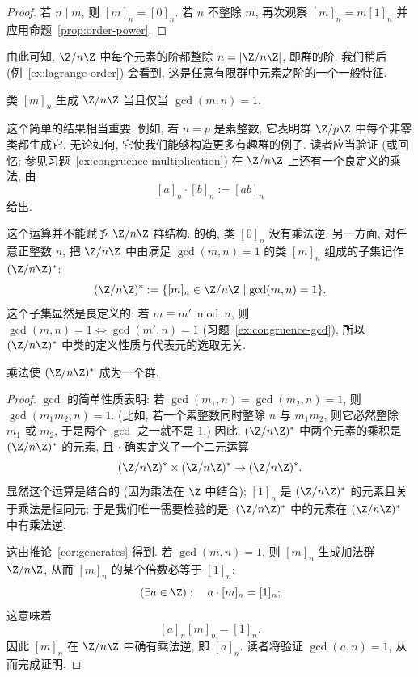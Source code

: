 \begin{proof}
若 $n \mid m$, 则 $[m]_n = [0]_n$. 若 $n$ 不整除 $m$, 再次观察 $[m]_n = m[1]_n$ 并应用命题~\ref{prop:order-power}.
\end{proof}

\begin{remark}
\label{rem:order-divides}
由此可知, $\Z/n\Z$ 中每个元素的阶都整除 $n = |\Z/n\Z|$, 即群的阶. 我们稍后 (例~\ref{ex:lagrange-order}) 会看到, 这是任意有限群中元素之阶的一个一般特征.
\end{remark}

\begin{corollary}
\label{cor:generates}
类 $[m]_n$ 生成 $\Z/n\Z$ 当且仅当 $\gcd(m,n) = 1$.
\end{corollary}

这个简单的结果相当重要. 例如, 若 $n = p$ 是素整数, 它表明群 $\Z/p\Z$ 中每个非零类都生成它. 无论如何, 它使我们能够构造更多有趣群的例子. 读者应当验证 (或回忆; 参见习题~\ref{ex:congruence-multiplication}) 在 $\Z/n\Z$ 上还有一个良定义的乘法, 由
\[
[a]_n \cdot [b]_n := [ab]_n
\]
给出.

这个运算并不能赋予 $\Z/n\Z$ 群结构: 的确, 类 $[0]_n$ 没有乘法逆. 另一方面, 对任意正整数 $n$, 把 $\Z/n\Z$ 中由满足 $\gcd(m,n) = 1$ 的类 $[m]_n$ 组成的子集记作 $(\Z/n\Z)^{*}$:
\[
(\Z/n\Z)^{*} := \{[m]_n \in \Z/n\Z \mid \gcd(m, n) = 1\}.
\]
这个子集显然是良定义的: 若 $m \equiv m' \bmod n$, 则 $\gcd(m,n) = 1 \iff \gcd(m',n) = 1$ (习题~\ref{ex:congruence-gcd}), 所以 $(\Z/n\Z)^{*}$ 中类的定义性质与代表元的选取无关.

\begin{proposition}
\label{prop:units-group}
乘法使 $(\Z/n\Z)^{*}$ 成为一个群.
\end{proposition}

\begin{proof}
$\gcd$ 的简单性质表明: 若 $\gcd(m_1, n) = \gcd(m_2, n) = 1$, 则 $\gcd(m_1 m_2, n) = 1$. (比如, 若一个素整数同时整除 $n$ 与 $m_1 m_2$, 则它必然整除 $m_1$ 或 $m_2$, 于是两个 $\gcd$ 之一就不是 $1$.) 因此, $(\Z/n\Z)^{*}$ 中两个元素的乘积是 $(\Z/n\Z)^{*}$ 的元素, 且 $\cdot$ 确实定义了一个二元运算
\[
(\Z/n\Z)^{*} \times (\Z/n\Z)^{*} \rightarrow (\Z/n\Z)^{*}.
\]
显然这个运算是结合的 (因为乘法在 $\Z$ 中结合); $[1]_n$ 是 $(\Z/n\Z)^{*}$ 的元素且关于乘法是恒同元; 于是我们唯一需要检验的是: $(\Z/n\Z)^{*}$ 中的元素在 $(\Z/n\Z)^{*}$ 中有乘法逆.

这由推论~\ref{cor:generates} 得到. 若 $\gcd(m, n) = 1$, 则 $[m]_n$ 生成加法群 $\Z/n\Z$, 从而 $[m]_n$ 的某个倍数必等于 $[1]_n$:
\[
(\exists a \in \Z): \quad a \cdot [m]_n = [1]_n;
\]
这意味着
\[
[a]_n [m]_n = [1]_n.
\]
因此 $[m]_n$ 在 $\Z/n\Z$ 中确有乘法逆, 即 $[a]_n$. 读者将验证 $\gcd(a,n) = 1$, 从而完成证明.
\end{proof}


